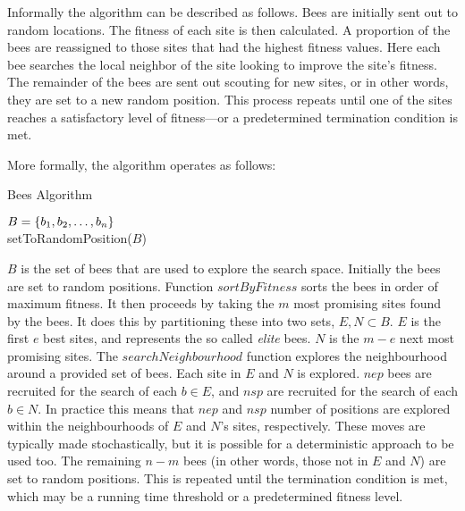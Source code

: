 
Informally the algorithm can be described as follows. Bees are initially sent out to random locations. The fitness of each site is then calculated. A proportion of the bees are reassigned to those sites that had the highest fitness values. Here each bee searches the local neighbor of the site looking to improve the site's fitness. The remainder of the bees are sent out scouting for new sites, or in other words, they are set to a new random position. This process repeats until one of the sites reaches a satisfactory level of fitness---or a predetermined termination condition is met.

More formally, the algorithm operates as follows:

\begin{algorithm}[H]
   \caption{Bees Algorithm}
   $B = \{b_1, b_2,\ldots, b_n\}$\\
   setToRandomPosition($B$)\\
\end{algorithm}

$B$ is the set of bees that are used to explore the search space. Initially the bees are set to random positions. Function $sortByFitness$ sorts the bees in order of maximum fitness. It then proceeds by taking the $m$ most promising sites found by the bees. It does this by partitioning these into two sets, $E, N \subset B$. $E$ is the first $e$ best sites, and represents the so called \emph{elite} bees. $N$ is the $m - e$ next most promising sites. The $searchNeighbourhood$ function explores the neighbourhood around a provided set of bees. Each site in $E$ and $N$ is explored. $nep$ bees are recruited for the search of each $b \in E$, and $nsp$ are recruited for the search of each $b \in N$. In practice this means that $nep$ and $nsp$ number of positions are explored within the neighbourhoods of $E$ and $N$'s sites, respectively. These moves are typically made stochastically, but it is possible for a deterministic approach to be used too. The remaining $n - m$ bees (in other words, those not in $E$ and $N$) are set to random positions. This is repeated until the termination condition is met, which may be a running time threshold or a predetermined fitness level. 

